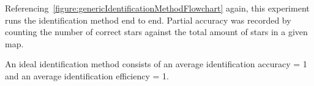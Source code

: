 Referencing~\autoref{figure:genericIdentificationMethodFlowchart} again, this experiment runs the identification
method end to end.
Partial accuracy was recorded by counting the number of correct stars against the total amount of stars in a given
map.

An ideal identification method consists of an average identification accuracy = 1 and an average identification
efficiency = 1.
